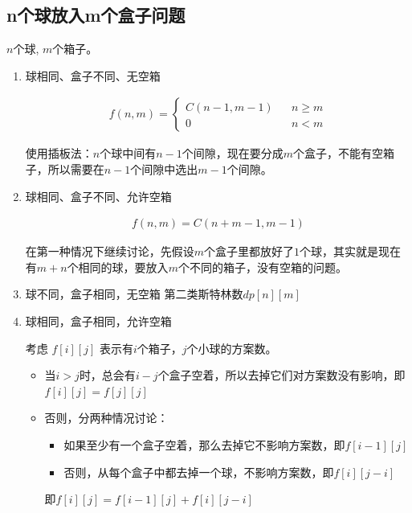 \subsection{n个球放入m个盒子问题}
$n$个球, $m$个箱子。
\begin{enumerate}
\item 球相同、盒子不同、无空箱\par
\begin{eqnarray*}
f(n, m) = 
\left\{
\begin{array}{cccc}
C(n - 1, m - 1) && n \geq m \\
0   && n < m
\end{array}
\right.
\end{eqnarray*} \par
使用插板法：$n$个球中间有$n - 1$个间隙，现在要分成$m$个盒子，不能有空箱子，所以需要在$n - 1$个间隙中选出$m - 1$个间隙。

\item 球相同、盒子不同、允许空箱\par
\begin{eqnarray*}
f(n, m) = C(n + m - 1, m - 1)
\end{eqnarray*} \par
在第一种情况下继续讨论，先假设$m$个盒子里都放好了$1$个球，其实就是现在有$m + n$个相同的球，要放入$m$个不同的箱子，没有空箱的问题。

\item 球不同，盒子相同，无空箱
第二类斯特林数$dp[n][m]$\par


\item 球相同，盒子相同，允许空箱\par
考虑 $\displaystyle f[i][j]$ 表示有$i$个箱子，$j$个小球的方案数。\par
\begin{itemize}
\item 当$i > j$时，总会有$i - j$个盒子空着，所以去掉它们对方案数没有影响，即$f[i][j] = f[j][j]$
\item 否则，分两种情况讨论：
\begin{itemize}
\item 如果至少有一个盒子空着，那么去掉它不影响方案数，即$f[i - 1][j]$
\item 否则，从每个盒子中都去掉一个球，不影响方案数，即$f[i][j - i]$
\end{itemize}

即$\displaystyle f[i][j] = f[i - 1][j] + f[i][j - i]$

\end{itemize}


\end{enumerate}

